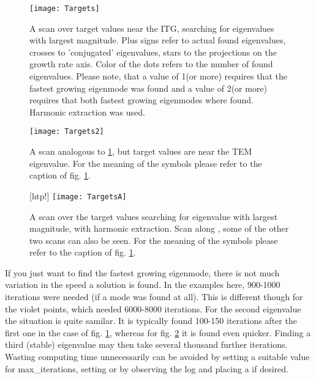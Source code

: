 \begin{figure}[htp!]
  \begin{center}
    \texttt{[image: Targets]}
    \caption{\label{fig:eivtargets1} A scan over target values near the ITG,
      searching for eigenvalues with largest magnitude.
      Plus signs refer to actual found eigenvalues, crosses to 'conjugated'
      eigenvalues, stars to the projections on the growth rate axis. Color
      of the dots refers to the number of found eigenvalues. Please note, that
      a value of 1(or more) requires that the fastest growing eigenmode was found and
      a value of 2(or more) requires that both fastest growing eigenmodes where found.
      Harmonic extraction was used.      
}
  \end{center}
\end{figure}
\begin{figure}[htp!]
  \begin{center}
    \texttt{[image: Targets2]}
    \caption{\label{fig:eivtargets2} A scan analogous to \ref{fig:eivtargets1}, 
      but target values are near the TEM eigenvalue.
      For the meaning of the symbols please refer to the caption of fig.
      \ref{fig:eivtargets1}.}
  \end{center}
\end{figure}
\begin{figure}
  \begin{center}[htp!]
    \texttt{[image: TargetsA]}
    \caption{\label{fig:eivtargetsa} A scan over the target values searching for eigenvalue with largest magnitude, with harmonic extraction.
      Scan along , some of the other two scans can also be
      seen.
      For the meaning of the symbols please refer to the caption of fig.
      \ref{fig:eivtargets1}.}
  \end{center}
\end{figure}

If you just want to find the fastest growing
eigenmode, there is not much variation in the speed a solution is found.
 In the examples here, 900-1000 iterations were
needed (if a mode was found at all). This is different though for the violet points,
 which needed 6000-8000 iterations.
For the second eigenvalue the situation is
quite samilar. It is typically found 100-150 iterations after the first one in
the case of fig. \ref{fig:eivtargets1}, whereas for fig. \ref{fig:eivtargets2}
it is found even quicker. Finding a third (stable) eigenvalue may then take several thousand further iterations.  
Wasting computing time unnecessarily can be avoided by setting a suitable value for max_iterations,
setting  or by observing the log and placing a  if desired.\\


